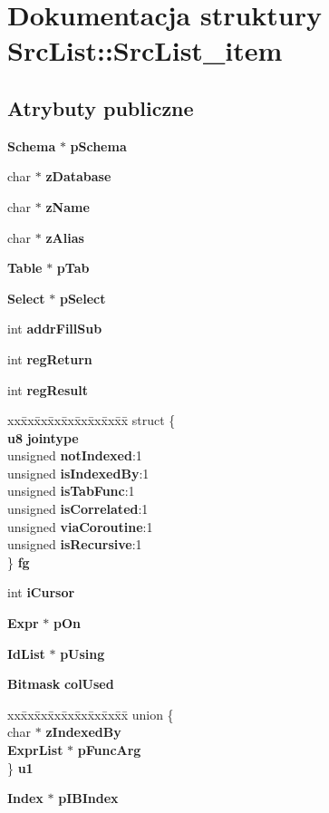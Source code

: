 \section{Dokumentacja struktury Src\+List\+::Src\+List\+\_\+item}
\label{struct_src_list_1_1_src_list__item}
\subsection*{Atrybuty publiczne}
\begin{DoxyCompactItemize}
\item 
\textbf{ Schema} $\ast$ \textbf{ p\+Schema}
\item 
char $\ast$ \textbf{ z\+Database}
\item 
char $\ast$ \textbf{ z\+Name}
\item 
char $\ast$ \textbf{ z\+Alias}
\item 
\textbf{ Table} $\ast$ \textbf{ p\+Tab}
\item 
\textbf{ Select} $\ast$ \textbf{ p\+Select}
\item 
int \textbf{ addr\+Fill\+Sub}
\item 
int \textbf{ reg\+Return}
\item 
int \textbf{ reg\+Result}
\item 
\begin{tabbing}
xx\=xx\=xx\=xx\=xx\=xx\=xx\=xx\=xx\=\kill
struct \{\\
\>\textbf{ u8} \textbf{ jointype}\\
\>unsigned \textbf{ notIndexed}:1\\
\>unsigned \textbf{ isIndexedBy}:1\\
\>unsigned \textbf{ isTabFunc}:1\\
\>unsigned \textbf{ isCorrelated}:1\\
\>unsigned \textbf{ viaCoroutine}:1\\
\>unsigned \textbf{ isRecursive}:1\\
\} \textbf{ fg}\\

\end{tabbing}\item 
int \textbf{ i\+Cursor}
\item 
\textbf{ Expr} $\ast$ \textbf{ p\+On}
\item 
\textbf{ Id\+List} $\ast$ \textbf{ p\+Using}
\item 
\textbf{ Bitmask} \textbf{ col\+Used}
\item 
\begin{tabbing}
xx\=xx\=xx\=xx\=xx\=xx\=xx\=xx\=xx\=\kill
union \{\\
\>char $\ast$ \textbf{ zIndexedBy}\\
\>\textbf{ ExprList} $\ast$ \textbf{ pFuncArg}\\
\} \textbf{ u1}\\

\end{tabbing}\item 
\textbf{ Index} $\ast$ \textbf{ p\+I\+B\+Index}
\end{DoxyCompactItemize}


